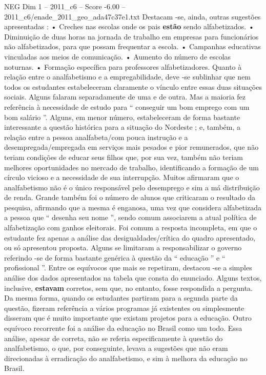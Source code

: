 \begin{textsample}{NEG Dim 1 – 2011\_c6 – Score -6.00 – 2011\_c6/enade\_2011\_geo\_ada47c37e1.txt}
Destacam -se, ainda, outras sugestões apresentadas : • Creches nas escolas onde os pais \textbf{estão} sendo alfabetizados. • Diminuição de duas horas na jornada de trabalho em empresas para funcionários não alfabetizados, para que possam frequentar a escola. • Campanhas educativas vinculadas aos meios de comunicação. • Aumento do número de escolas noturnas. • Formação específica para professores alfabetizadores.
Quanto à relação entre o analfabetismo e a empregabilidade, deve -se sublinhar que nem todos os estudantes estabeleceram claramente o vínculo entre essas duas situações sociais.
Alguns falaram separadamente de uma e de outra.
Mas a maioria fez referência à necessidade de estudo para “ conseguir um bom emprego com um bom salário ”.
Alguns, em menor número, estabeleceram de forma bastante interessante a questão histórica para a situação do Nordeste ; e, também, a relação entre a pessoa analfabeta/com pouca instrução e a desempregada/empregada em serviços mais pesados e pior remunerados, que não teriam condições de educar seus filhos que, por sua vez, também não teriam melhores oportunidades no mercado de trabalho, identificando a formação de um círculo vicioso e a necessidade de sua interrupção.
Muitos afirmaram que o analfabetismo não é o único responsável pelo desemprego e sim a má distribuição de renda.
Grande também foi o número de alunos que criticaram o resultado da pesquisa, afirmando que a mesma é enganosa, uma vez que considera alfabetizada a pessoa que “ desenha seu nome ”, sendo comum associarem a atual política de alfabetização com ganhos eleitorais.
Foi comum a resposta incompleta, em que o estudante fez apenas a análise das desigualdades/crítica do quadro apresentado, ou só apresentou proposta.
Alguns se limitaram a responsabilizar o governo referindo -se de forma bastante genérica à questão da “ educação ” e “ profissional ”.
Entre os equívocos que mais se repetiram, destacou -se a simples análise dos dados apresentados na tabela que consta do enunciado.
Alguns textos, inclusive, \textbf{estavam} corretos, sem que, no entanto, fosse respondida a pergunta.
Da mesma forma, quando os estudantes partiram para a segunda parte da questão, fizeram referência a vários programas já existentes ou simplesmente disseram que é muito importante que existam projetos para a educação.
Outro equívoco recorrente foi a análise da educação no Brasil como um todo.
Essa análise, apesar de correta, não se referia especificamente à questão do analfabetismo, o que, por conseguinte, levava a sugestões que não eram direcionadas à erradicação do analfabetismo, e sim à melhora da educação no Brasil.

\end{textsample}
